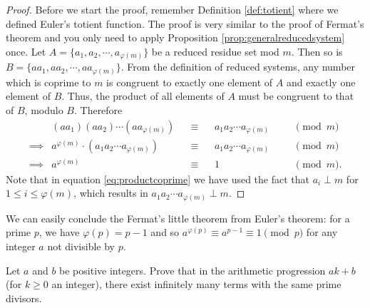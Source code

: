 \documentclass{subfile}
\begin{document}
		\begin{proof} 
			Before we start the proof, remember Definition \ref{def:totient} where we defined Euler's totient function. The proof is very similar to the proof of Fermat's theorem and you only need to apply Proposition \ref{prop:generalreducedsystem} once. Let $A=\{a_1, a_2, \cdots, a_{\varphi(m)}\}$ be a reduced residue set mod $m$. Then so is $B=\{aa_1, aa_2, \cdots, aa_{\varphi(m)}\}$. From the definition of reduced systems, any number which is coprime to $m$ is congruent to exactly one element of $A$ and exactly one element of $B$. Thus, the product of all elements of $A$ must be congruent to that of $B$, modulo $B$. Therefore
			\begin{align}
			& (aa_1) (aa_2) \cdots (aa_{\varphi(m)}) && \equiv && a_1 a_2 \cdots a_{\varphi(m)} &&&  \pmod m\nonumber\\
			\implies & a^{\varphi(m)} \cdot \left( a_1 a_2 \cdots a_{\varphi(m)}\right) && \equiv && a_1 a_2 \cdots a_{\varphi(m)} &&&  \pmod m\nonumber\\
			\label{eq:productcoprime}\implies & a^{\varphi(m)} && \equiv && 1 &&& \pmod m.
			\end{align}
			Note that in equation \eqref{eq:productcoprime} we have used the fact that $a_i \perp m$ for $1 \leq i \leq \varphi(m)$, which results in $a_1 a_2 \cdots a_{\varphi(m)} \perp m$. 
		\end{proof}
	We can easily conclude the Fermat's little theorem from Euler's theorem: for a prime $p$, we have $\varphi(p)=p-1$ and so $a^{\varphi(p)} \equiv a^{p-1} \equiv 1 \pmod p$ for any integer $a$ not divisible by $p$.
		\begin{problem}
			Let $a$ and $b$ be positive integers. Prove that in the arithmetic progression $ak+b$ (for $k \geq 0$ an integer), there exist infinitely many terms with the same prime divisors.
		\end{problem}
		
\end{document}
